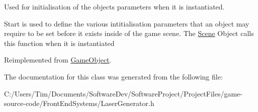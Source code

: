 Used for initialisation of the objects parameters when it is instantiated. 

Start is used to define the various intitialisation parameters that an object may require to be set before it exists inside of the game scene. The \hyperlink{class_scene}{Scene} Object calls this function when it is instantiated 

Reimplemented from \hyperlink{class_game_object_aeeb2162f2779e5591a372a1568bc5c68}{Game\+Object}.



The documentation for this class was generated from the following file\+:\begin{DoxyCompactItemize}
\item 
C\+:/\+Users/\+Tim/\+Documents/\+Software\+Dev/\+Software\+Project/\+Project\+Files/game-\/source-\/code/\+Front\+End\+Systems/Laser\+Generator.\+h\end{DoxyCompactItemize}
